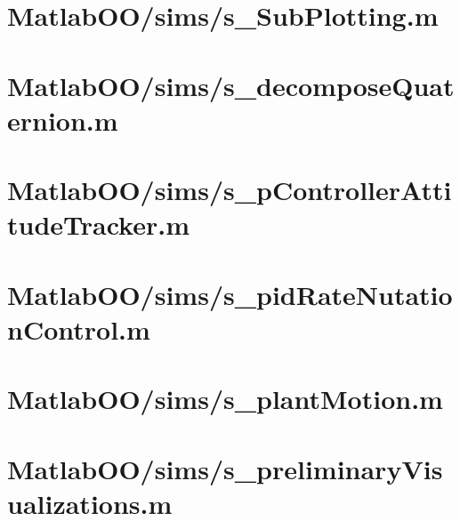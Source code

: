 \pagebreak
\section{MatlabOO/sims/s\_SubPlotting.m}\label{code:MatlabOO/sims/s_SubPlotting.m}


\pagebreak
\section{MatlabOO/sims/s\_decomposeQuaternion.m}\label{code:MatlabOO/sims/s_decomposeQuaternion.m}


\pagebreak
\section{MatlabOO/sims/s\_pControllerAttitudeTracker.m}\label{code:MatlabOO/sims/s_pControllerAttitudeTracker.m}


\pagebreak
\section{MatlabOO/sims/s\_pidRateNutationControl.m}\label{code:MatlabOO/sims/s_pidRateNutationControl.m}


\pagebreak
\section{MatlabOO/sims/s\_plantMotion.m}\label{code:MatlabOO/sims/s_plantMotion.m}


\pagebreak
\section{MatlabOO/sims/s\_preliminaryVisualizations.m}\label{code:MatlabOO/sims/s_preliminaryVisualizations.m}


